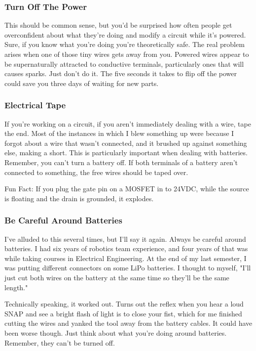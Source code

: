 \subsubsection{Turn Off The Power}

This should be common sense, but you'd be surprised how often people get overconfident about what they're doing and modify a circuit while it's powered. Sure, if you know what you're doing you're theoretically safe. The real problem arises when one of those tiny wires gets away from you. Powered wires appear to be supernaturally attracted to conductive terminals, particularly ones that will causes sparks. Just don't do it. The five seconds it takes to flip off the power could save you three days of waiting for new parts.

\subsubsection{Electrical Tape}

If you're working on a circuit, if you aren't immediately dealing with a wire, tape the end. Most of the instances in which I blew something up were because I forgot about a wire that wasn't connected, and it brushed up against something else, making a short. This is particularly important when dealing with batteries. Remember, you can't turn a battery off. If both terminals of a battery aren't connected to something, the free wires should be taped over.

Fun Fact: If you plug the gate pin on a MOSFET in to 24VDC, while the source is floating and the drain is grounded, it explodes.

\subsubsection{Be Careful Around Batteries}

I've alluded to this several times, but I'll say it again. Always be careful around batteries. I had six years of robotics team experience, and four years of that was while taking courses in Electrical Engineering. At the end of my last semester, I was putting different connectors on some LiPo batteries. I thought to myself, "I'll just cut both wires on the battery at the same time so they'll be the same length."

Technically speaking, it worked out. Turns out the reflex when you hear a loud SNAP and see a bright flash of light is to close your fist, which for me finished cutting the wires and yanked the tool away from the battery cables. It could have been worse though. Just think about what you're doing around batteries. Remember, they can't be turned off.


